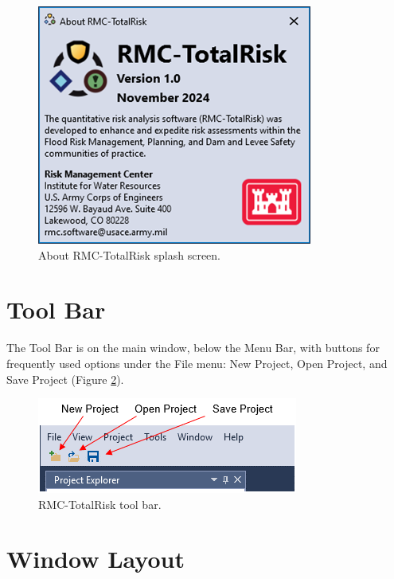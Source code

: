 \documentclass[
]{book}
\begin{document}
\begin{figure}

{\centering \includegraphics{images/figure16} 

}

\caption{About RMC-TotalRisk splash screen.}\label{fig:figure-16}
\end{figure}

\hypertarget{gui-tool-bar}{%
\section{Tool Bar}\label{gui-tool-bar}}

The Tool Bar is on the main window, below the Menu Bar, with buttons for frequently used options under the File menu: New Project, Open Project, and Save Project (Figure \ref{fig:figure-17}).

\begin{figure}

{\centering \includegraphics{images/figure17} 

}

\caption{RMC-TotalRisk tool bar.}\label{fig:figure-17}
\end{figure}

\hypertarget{gui-window-layout}{%
\section{Window Layout}\label{gui-window-layout}}
\end{document}
